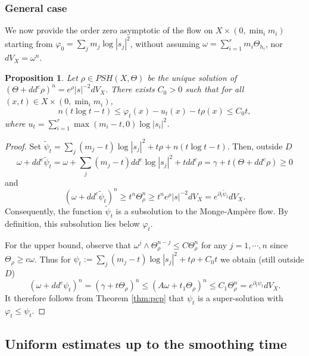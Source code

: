 \documentclass[11pt]{amsart}
\numberwithin{equation}{section}
\newtheorem{prop}[theorem]{Proposition}
\newcommand{\f}{\varphi}
\begin{document}
\subsubsection{General case}

We now provide  the order zero asymptotic of the flow on $X \times (0,\min_i m_i)$ starting from $\varphi_0=\sum_j m_j \log|s_j|^2 $, without assuming  $\omega=\sum_{i=1}^r m_i \Theta_{h_i}$, nor $dV_X=\omega^n$.



\begin{prop} \label{prop:0uniform1}
Let $\rho \in PSH(X,\Theta)$ be the unique
solution of $(\Theta+dd^c \rho)^n =e^{\rho} |s|^{-2} dV_X$.
 There exists $C_0>0$ such that  
for all $(x,t) \in X \times (0,\min_i m_i)$,
$$
n(t\log t-t) \leq \f_t(x) - u_t(x) -t\rho(x) \leq   C_0 t,
$$
where $u_t=\sum_{i=1}^r \max(m_i-t,0) \log|s_i|^2$. 
\end{prop}

 

\begin{proof}
 Set $\tilde{\psi}_t=  \sum_j (m_j-t) \log|s_j|^2+t \rho+n(t\log t-t) $. Then, outside $D$
 $$\omega+ dd^c \tilde{\psi}_t = \omega+ \sum_j (m_j-t) dd^c \log |s_j|^2 +t dd^c \rho= \gamma +t(\Theta+dd^c \rho) \geq 0 $$ and
$$
		(\omega+dd^c \tilde{\psi}_t)^n \geq    t^n \Theta_\rho^n
		\geq t^n e^{\rho} |s|^{-2} dV_X = e^{\partial_t \tilde{\psi}_t} dV_X.
$$
	Consequently, the function $\tilde{\psi}_t$ is a subsolution to the Monge-Amp\`ere flow. By definition, this subsolution lies below $\varphi_t$.  
	
\smallskip

For the upper bound,   observe that  $\omega^j \wedge \Theta_{\rho}^{n-j} \leq C \Theta_{\rho}^n$ for any $j=1, \cdots, n$
since $\Theta_{\rho} \geq c \omega$. 
Thus for $\psi_t:= \sum_j(m_j-t) \log |s_j|^2+t\rho+C_0t $ we obtain (still outside $D$)
$$	
(\omega+dd^c {\psi}_t)^n =  \left ( \gamma+   t\Theta_\rho \right) ^n 
\leq \left ( A\omega+   t_1\Theta_\rho \right)^n \leq C_1 \Theta_\rho^n =e^{\partial_t \psi_t} dV_X. 
$$
It therefore follows  from Theorem \ref{thm:pcp}  that $\psi_t$ is a super-solution with $\f_t \leq \psi_t$.
\end{proof}
 


  




\subsection{Uniform estimates up to the smoothing time}
\end{document}
